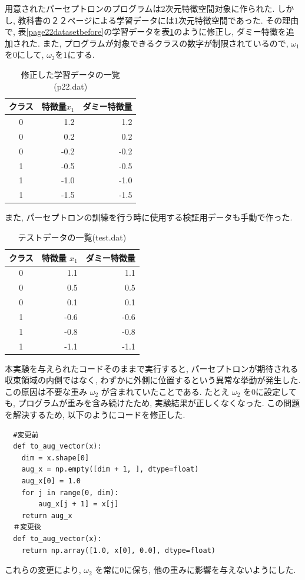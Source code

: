 \documentclass[a4j, 12pt]{jarticle}
\begin{document}
用意されたパーセプトロンのプログラムは2次元特徴空間対象に作られた. しかし, 教科書の２２ページによる学習データには1次元特徴空間であった. その理由で, 表\ref{page22datasetbefore}の学習データを表\ref{page22dataset}のように修正し, ダミー特徴を追加された. また, プログラムが対象できるクラスの数字が制限されているので, $\omega_1$を$0$にして, $\omega_2$を$1$にする. 
\begin{table}[H]
  \centering
  \caption{修正した学習データの一覧(p22.dat)}\label{page22dataset}
  \begin{tabular}{c r r}
    \hline
    クラス & 特徴量$x_1$ & ダミー特徴量 \\
    \hline
    0 &  1.2 &  1.2 \\
    0 &  0.2 &  0.2 \\
    0 & -0.2 & -0.2 \\
    1 & -0.5 & -0.5 \\
    1 & -1.0 & -1.0 \\
    1 & -1.5 & -1.5 \\
    \hline
  \end{tabular}
\end{table}
また, パーセプトロンの訓練を行う時に使用する検証用データも手動で作った.
\begin{table}[H]
  \centering
  \caption{テストデータの一覧(test.dat)}
  \begin{tabular}{c r r}
    \hline
    クラス & 特徴量 $x_1$ & ダミー特徴量 \\
    \hline
    0 &  1.1 &  1.1\\
    0 &  0.5 &  0.5\\
    0 &  0.1 &  0.1\\
    1 & -0.6 & -0.6\\
    1 & -0.8 & -0.8\\
    1 & -1.1 & -1.1\\
    \hline
  \end{tabular}
\end{table}
本実験を与えられたコードそのままで実行すると, パーセプトロンが期待される収束領域の内側ではなく, わずかに外側に位置するという異常な挙動が発生した. この原因は不要な重み $\omega_2$ が含まれていたことである. たとえ $\omega_2$ を0に設定しても, プログラムが重みを含み続けたため, 実験結果が正しくなくなった. この問題を解決するため, 以下のようにコードを修正した. 
\begin{verbatim}
  #変更前
  def to_aug_vector(x):
    dim = x.shape[0]
    aug_x = np.empty([dim + 1, ], dtype=float)
    aug_x[0] = 1.0
    for j in range(0, dim):
        aug_x[j + 1] = x[j]
    return aug_x
  ＃変更後
  def to_aug_vector(x):
    return np.array([1.0, x[0], 0.0], dtype=float)
\end{verbatim}
これらの変更により, $\omega_2$ を常に0に保ち, 他の重みに影響を与えないようにした. 
\end{document}
